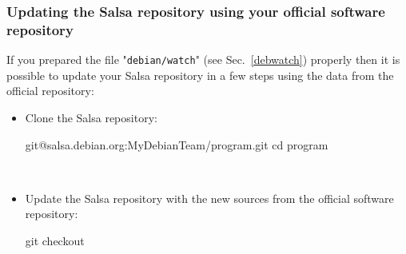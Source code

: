 \vspace{-0.75cm}
\subsubsection*{Updating the Salsa repository using your official software repository}

If you prepared the file "{\texttt{debian/watch}}" (see Sec.~\ref{debwatch}) properly then it is possible to update your Salsa repository in a few steps using the data from the official repository: 
\begin{itemize}
\item Clone the Salsa repository:
\vspace{-0.25cm}
{\footnotesize{
\begin{scripti}
\uprompt{~}   git@salsa.debian.org:MyDebianTeam/program.git
\uprompt{~} cd program
\end{scripti}
}}\\[-1.25cm]
\item Update the Salsa repository with the new sources from the official software repository:
\vspace{-0.25cm}
\begin{scripti}
 git checkout 

\end{scripti}
\end{itemize}
